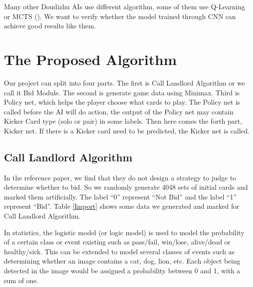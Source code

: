 \documentclass{article}
\begin{document}
Many other Doudizhu AIs use different algorithm, some of them use Q-Learning or MCTS (\cite{you2019combinational}). We want to verify whether the model trained through CNN can achieve good results like them. 

\section{The Proposed Algorithm}

Our project can split into four parts. The first is Call Landlord Algorithm or we call it Bid Module. The second is generate game data using Minimax. Third is Policy net, which helps the player choose what cards to play. The Policy net is called before the AI will do action, the output of the Policy net may contain Kicker Card type (solo or pair) in some labels. Then here comes the forth part, Kicker net. If there is a Kicker card need to be predicted, the Kicker net is called.

\subsection{Call Landlord Algorithm}
In the reference paper\cite{liu2018solution}, we find that they do not design a strategy to judge to determine whether to bid. So we randomly generate 4048 sets of initial cards and marked them artificially. The label ``0'' represent ``Not Bid'' and the label ``1'' represent ``Bid''. Table \ref{Import} shows some data we generated and marked for Call Landlord Algorithm.

In statistics, the logistic model (or logic model)\cite{enwiki:1023179480} is used to model the probability of a certain class or event existing such as pass/fail, win/lose, alive/dead or healthy/sick. This can be extended to model several classes of events such as determining whether an image contains a cat, dog, lion, etc. Each object being detected in the image would be assigned a probability between 0 and 1, with a sum of one.
\end{document}
